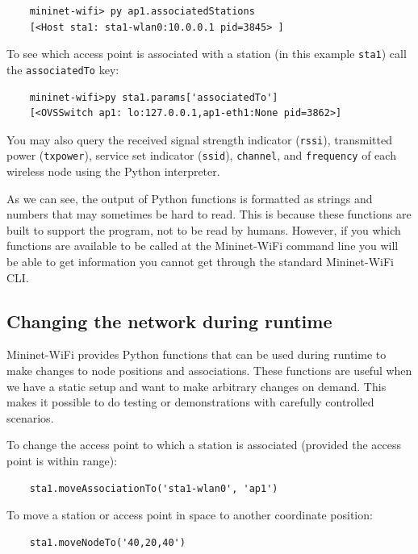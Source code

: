 \begin{verbatim}
    mininet-wifi> py ap1.associatedStations
    [<Host sta1: sta1-wlan0:10.0.0.1 pid=3845> ]
\end{verbatim}
   
\noindent To see which access point is associated with a station (in this example \texttt{sta1}) call the \texttt{associatedTo} key:

\begin{verbatim}
    mininet-wifi>py sta1.params['associatedTo']
    [<OVSSwitch ap1: lo:127.0.0.1,ap1-eth1:None pid=3862>]
\end{verbatim}
        

\noindent You may also query the received signal strength indicator (\texttt{rssi}), transmitted power (\texttt{txpower}), service set indicator (\texttt{ssid}), \texttt{channel}, and \texttt{frequency} of each wireless node using the Python interpreter.

\noindent As we can see, the output of Python functions is formatted as strings and numbers that may sometimes be hard to read. This is because these functions are built to support the program, not to be read by humans. However, if you which functions are available to be called at the Mininet-WiFi command line you will be able to get information you cannot get through the standard Mininet-WiFi CLI.

\subsection{Changing the network during runtime}

Mininet-WiFi provides Python functions that can be used during runtime to make changes to node positions and associations. These functions are useful when we have a static setup and want to make arbitrary changes on demand. This makes it possible to do testing or demonstrations with carefully controlled scenarios.

To change the access point to which a station is associated (provided the access point is within range):

\begin{verbatim}
    sta1.moveAssociationTo('sta1-wlan0', 'ap1') 
\end{verbatim}
    

\noindent To move a station or access point in space to another coordinate position:

\begin{verbatim}
    sta1.moveNodeTo('40,20,40')
\end{verbatim}
    
